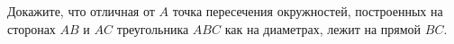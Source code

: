 \begin{ex}
	\begin{condition}
		Докажите, что отличная от \( A  \) точка пересечения окружностей, построенных на сторонах \( AB  \) и \( AC  \) треугольника \( ABC  \) как на диаметрах, лежит на прямой \( BC \).
	\end{condition}
\end{ex}